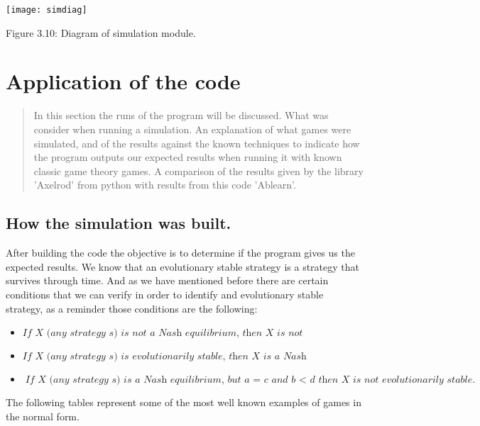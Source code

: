 \documentclass{article}
\begin{document}
\begin{center}
	\texttt{[image: simdiag]}

Figure 3.10: Diagram of simulation module.
\end{center}


\newpage
\section{Application of the code}

\maketitle
\begin{abstract}
In this section the runs of the program will be discussed. What was consider when running a simulation. An explanation of what games were simulated, and of the results against the known techniques to indicate how the program outputs our expected results when running it with known classic game theory games. A comparison of the results given by the  library 'Axelrod' from python with results from this code 'Ablearn'.
\end{abstract}

\subsection{How the simulation was built.}
After building the code the objective is to determine if the program gives us the expected results. We know that an evolutionary stable strategy is a strategy that survives through time. And as we have mentioned before there are certain conditions that we can verify in order to identify and evolutionary stable strategy, as a reminder those conditions are the following:

\begin{itemize}
\item $\textit{If X (any strategy s) is not a Nash equilibrium, then X is not evolutionarily stable.}$ 
\item $\textit{If X (any strategy s) is evolutionarily stable, then X is a Nash equilibrium.}$ 
\item $\textit{If X (any strategy s) is a Nash equilibrium, but  $\textit{a = c and b $<$ d}$ then X is not evolutionarily stable.}$
\end{itemize}

The following tables represent some of the most well known examples of games in the normal form. 
\end{document}
